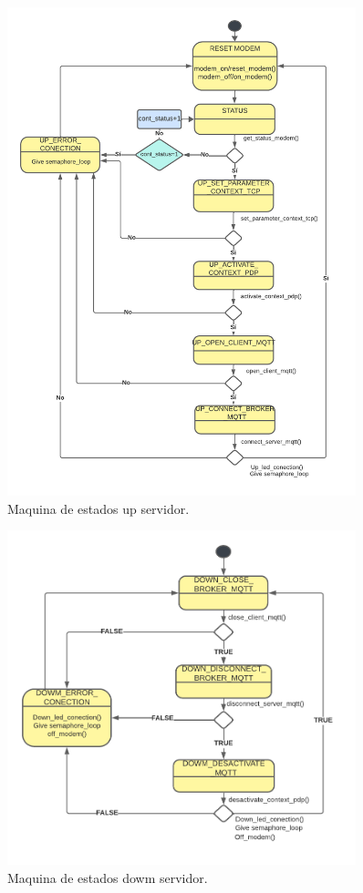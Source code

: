 \begin{figure}[htbp]
  \centering
	\includegraphics[width=0.9\textwidth]{./Figures/SM up server.png}
	\caption{Maquina de estados up servidor.}
	\label{fig:Maquina de estados up servidor}
\end{figure}

\begin{figure}[htbp]
  \centering
	\includegraphics[width=0.9\textwidth]{./Figures/SM down server.png}
	\caption{Maquina de estados dowm servidor.}
	\label{fig:Maquina de estados dowm servidor}
\end{figure}




